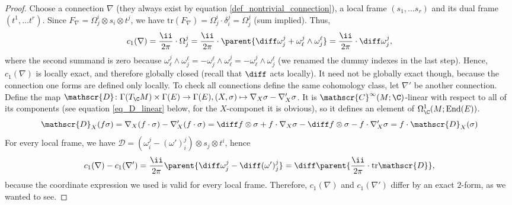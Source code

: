 \begin{proof}
    Choose a connection \(\nabla\) (they always exist by equation \eqref{def_nontrivial_connection}), a local frame \((s_1, \ldots s_r)\) and its dual frame \((t^1, \ldots t^r)\). Since \(F_\nabla=\Omega_j^i\otimes s_i \otimes t^j\), we have \(\mathrm{tr} (F_\nabla)=\Omega^i_j \cdot \delta^j_i=\Omega^j_j\) (sum implied). Thus, 
    \[
    c_1(\nabla)=\frac{\ii}{2\pi} \cdot \Omega^j_j=\frac{\ii}{2\pi} \cdot \parent{\diff \omega^j_j+\omega^j_\ell \wedge \omega^\ell_j}=\frac{\ii}{2\pi} \cdot \diff \omega^j_j,
    \]
    where the second summand is zero because \(\omega^j_\ell \wedge \omega^\ell_j=-\omega_j^\ell\wedge \omega_\ell^j=-\omega_\ell^j \wedge\omega_j^\ell\) (we renamed the dummy indexes in the last step). Hence, \(c_1(\nabla)\) is locally exact, and therefore globally closed (recall that \(\diff\) acts locally). It need not be globally exact though, because the connection one forms are defined only locally. To check all connections define the same cohomology class, let \(\nabla'\) be another connection. Define the map \(\mathscr{D}\colon \Gamma(T_\C M) \times \Gamma(E) \to \Gamma(E), (X, \sigma) \mapsto \nabla_X \sigma-\nabla'_X \sigma\). It is \(\mathscr{C}^\infty(M;\C)\)-linear with respect to all of its components (see equation \eqref{eq_D_linear} below, for the \(X\)-componet it is obvious), so it defines an element of \(\Omega^1_\C(M; \mathrm{End}(E))\). 
    \begin{equation} \label{eq_D_linear}
        \mathscr{D}_X(f \sigma)=\nabla_X (f \cdot \sigma)-\nabla'_X(f \cdot \sigma)=\diff f \otimes \sigma + f \cdot \nabla_X \sigma-\diff f \otimes \sigma-f \cdot \nabla'_X \sigma= f \cdot \mathscr{D}_X(\sigma)
    \end{equation}
    For every local frame, we have \(\mathscr{D}=(\omega^j_i-(\omega')^j_i) \otimes s_j \otimes t^i\), hence
    \begin{align*}
        c_1(\nabla)-c_1(\nabla')=\frac{\ii}{2 \pi} \parent{\diff \omega^j_j-\diff (\omega')^j_j}=\diff \parent{\frac{\ii}{2 \pi} \cdot \mathrm{tr} \mathscr{D}},
    \end{align*} 
    because the coordinate expression we used is valid for every local frame. Therefore, \(c_1(\nabla)\) and \(c_1(\nabla')\) differ by an exact \(2\)-form, as we wanted to see.
\end{proof}

